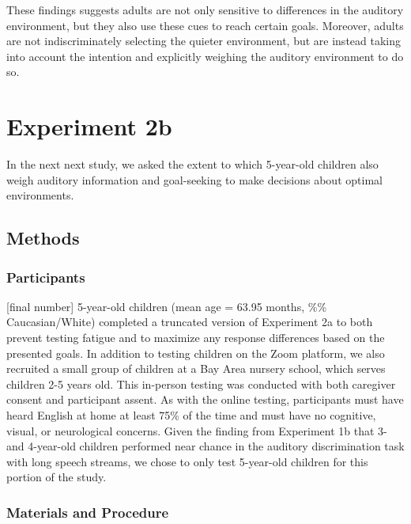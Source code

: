 \documentclass[10pt, letterpaper]{article}
\begin{document}
These findings suggests adults are not only sensitive to differences in
the auditory environment, but they also use these cues to reach certain
goals. Moreover, adults are not indiscriminately selecting the quieter
environment, but are instead taking into account the intention and
explicitly weighing the auditory environment to do so.

\hypertarget{experiment-2b}{%
\section{Experiment 2b}\label{experiment-2b}}

In the next next study, we asked the extent to which 5-year-old children
also weigh auditory information and goal-seeking to make decisions about
optimal environments.

\hypertarget{methods-3}{%
\subsection{Methods}\label{methods-3}}

\hypertarget{participants-3}{%
\subsubsection{Participants}\label{participants-3}}

{[}final number{]} 5-year-old children (mean age = 63.95 months, \%\%
Caucasian/White) completed a truncated version of Experiment 2a to both
prevent testing fatigue and to maximize any response differences based
on the presented goals. In addition to testing children on the Zoom
platform, we also recruited a small group of children at a Bay Area
nursery school, which serves children 2-5 years old. This in-person
testing was conducted with both caregiver consent and participant
assent. As with the online testing, participants must have heard English
at home at least 75\% of the time and must have no cognitive, visual, or
neurological concerns. Given the finding from Experiment 1b that 3- and
4-year-old children performed near chance in the auditory discrimination
task with long speech streams, we chose to only test 5-year-old children
for this portion of the study.

\hypertarget{materials-and-procedure-3}{%
\subsubsection{Materials and
Procedure}\label{materials-and-procedure-3}}
\end{document}
